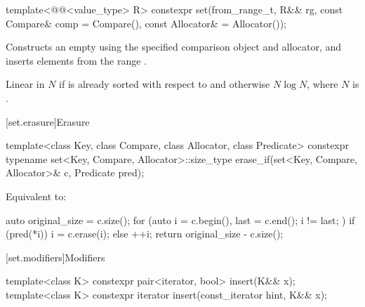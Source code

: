 %
\begin{itemdecl}
template<@@<value_type> R>
  constexpr set(from_range_t, R&& rg, const Compare& comp = Compare(),
                const Allocator& = Allocator());
\end{itemdecl}

\begin{itemdescr}
\pnum
\effects
Constructs an empty  using the specified comparison object and allocator,
and inserts elements from the range .

\pnum
\complexity
Linear in $N$ if  is already sorted with respect to  and
otherwise $N \log N$, where $N$ is .
\end{itemdescr}

[set.erasure]{Erasure}

%
\begin{itemdecl}
template<class Key, class Compare, class Allocator, class Predicate>
  constexpr typename set<Key, Compare, Allocator>::size_type
    erase_if(set<Key, Compare, Allocator>& c, Predicate pred);
\end{itemdecl}

\begin{itemdescr}
\pnum
\effects
Equivalent to:
\begin{codeblock}
auto original_size = c.size();
for (auto i = c.begin(), last = c.end(); i != last; ) {
  if (pred(*i)) {
    i = c.erase(i);
  } else {
    ++i;
  }
}
return original_size - c.size();
\end{codeblock}
\end{itemdescr}

[set.modifiers]{Modifiers}

%
\begin{itemdecl}
template<class K> constexpr pair<iterator, bool> insert(K&& x);
template<class K> constexpr iterator insert(const_iterator hint, K&& x);
\end{itemdecl}

